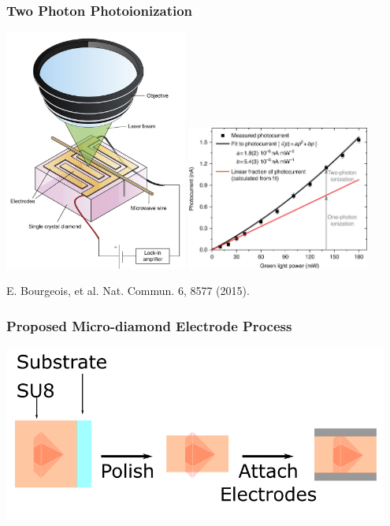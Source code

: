 \documentclass{beamer}
\begin{document}
\begin{frame}\frametitle{Two Photon Photoionization}
    \centering
    \includegraphics[width=0.45\textwidth]{Images/TwoPhotonGroup.png}
    \includegraphics[width=0.45\textwidth]{Images/TwoPhotonPlot.jpg}

    E. Bourgeois, et al. Nat. Commun. 6, 8577 (2015).
\end{frame}

\begin{frame}\frametitle{Proposed Micro-diamond Electrode Process}
    \centering
    \includegraphics[width=0.95\textwidth]{Images/ElectrodeProcess.png}
\end{frame}
\end{document}
